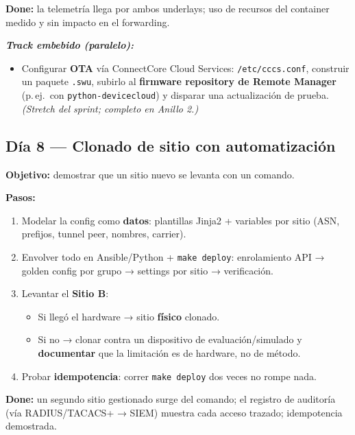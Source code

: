\documentclass[11pt,a4paper]{article}
\newcommand{\file}[1]{\texttt{#1}}
\newcommand{\done}{\textbf{Done:}}
\newcommand{\embebido}{\textit{Track embebido (paralelo):}}
\begin{document}
\begin{clave}
\small
\done{} la telemetría llega por ambos underlays; uso de recursos del container medido y sin
impacto en el forwarding.
\end{clave}

\textbf{\embebido}
\begin{itemize}
  \item Configurar \textbf{OTA} vía ConnectCore Cloud Services: \file{/etc/cccs.conf},
        construir un paquete \file{.swu}, subirlo al \textbf{firmware repository de Remote
        Manager} (p.\,ej.\ con \file{python-devicecloud}) y disparar una actualización de
        prueba. \textit{(Stretch del sprint; completo en Anillo 2.)}
\end{itemize}

\subsection{Día 8 — Clonado de sitio con automatización}

\textbf{Objetivo:} demostrar que un sitio nuevo se levanta con un comando.

\textbf{Pasos:}
\begin{enumerate}
  \item Modelar la config como \textbf{datos}: plantillas Jinja2 + variables por sitio
        (ASN, prefijos, tunnel peer, nombres, carrier).
  \item Envolver todo en Ansible/Python + \file{make deploy}: enrolamiento API → golden config
        por grupo → settings por sitio → verificación.
  \item Levantar el \textbf{Sitio B}:
        \begin{itemize}
          \item Si llegó el hardware → sitio \textbf{físico} clonado.
          \item Si no → clonar contra un dispositivo de evaluación/simulado y
                \textbf{documentar} que la limitación es de hardware, no de método.
        \end{itemize}
  \item Probar \textbf{idempotencia}: correr \file{make deploy} dos veces no rompe nada.
\end{enumerate}

\begin{clave}
\small
\done{} un segundo sitio gestionado surge del comando; el registro de auditoría
(vía RADIUS/TACACS+ → SIEM) muestra cada acceso trazado; idempotencia demostrada.
\end{clave}
\end{document}
